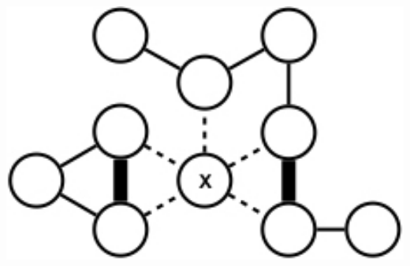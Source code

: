 \documentclass{beamer}
\begin{document}
\begin{frame}
\begin{columns}
\begin{column}{0.35\textwidth}
\begin{center}
		\includegraphics[width=1.0\textwidth]{vertex_local}
	\end{center}
\end{column}

\end{columns}


\end{frame}


\end{document}
